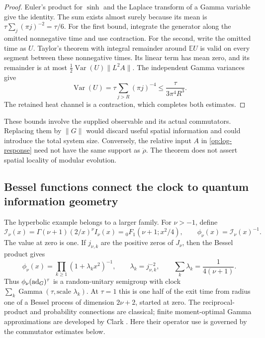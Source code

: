 \begin{proof}
Euler's product for $\sinh$ and the Laplace transform of a Gamma variable
give the identity. The sum exists almost surely because its mean is
$\tau\sum_j(\pi j)^{-2}=\tau/6$. For the first bound, integrate the
generator along the omitted nonnegative time and use contraction. For the
second, write the omitted time as $U$. Taylor's theorem with integral
remainder around $\mathbb EU$ is valid on every segment between these
nonnegative times. Its linear term has mean zero, and its remainder is at
most $\tfrac12\operatorname{Var}(U)\|L^2A\|$. The independent Gamma
variances give
\[
 \operatorname{Var}(U)=\tau\sum_{j>R}(\pi j)^{-4}
 \le\frac{\tau}{3\pi^4R^3}.
\]
The retained heat channel is a contraction, which completes both estimates.
\end{proof}

These bounds involve the supplied observable and its actual commutators.
Replacing them by $\|G\|$ would discard useful spatial information and
could introduce the total system size. Conversely, the relative input $A$
in \eqref{op:log-response} need not have the same support as $\dot\rho$.
The theorem does not assert spatial locality of modular evolution.


\subsection{Bessel functions connect the clock to quantum information geometry}
\label{op:bessel}

The hyperbolic example belongs to a larger family. For $\nu>-1$, define
\[
 \mathcal I_\nu(x)=\Gamma(\nu+1)(2/x)^\nu I_\nu(x)
 ={}_0F_1(\nu+1;x^2/4),\qquad \phi_\nu(x)=\mathcal I_\nu(x)^{-1}.
\]
The value at zero is one. If $j_{\nu,k}$ are the positive zeros of $J_\nu$,
then the Bessel product gives
\[
 \phi_\nu(x)=\prod_{k\ge1}(1+\lambda_kx^2)^{-1},\qquad
 \lambda_k=j_{\nu,k}^{-2},\qquad
 \sum_k\lambda_k=\frac1{4(\nu+1)}.
\]
Thus $\phi_\nu(\operatorname{ad}_G)^\tau$ is a random-unitary semigroup with clock
$\sum_k\operatorname{Gamma}(\tau,\text{scale }\lambda_k)$. At $\tau=1$
this is one half of the exit time from radius one of a Bessel process of
dimension $2\nu+2$, started at zero. The reciprocal-product and probability
connections are classical; finite moment-optimal Gamma approximations are
developed by Clark \citep{Clark2026}. Here their operator use is governed by
the commutator estimates below.

